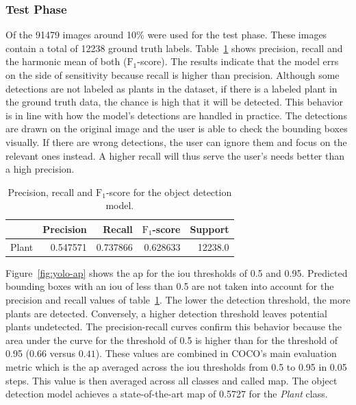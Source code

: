 \documentclass[draft,final]{vutinfth} %
\begin{document}
\subsubsection{Test Phase}
\label{sssec:yolo-test}

Of the 91479 images around 10\% were used for the test phase. These
images contain a total of 12238 ground truth
labels. Table~\ref{tab:yolo-metrics} shows precision, recall and the
harmonic mean of both ($\mathrm{F}_1$-score). The results indicate
that the model errs on the side of sensitivity because recall is
higher than precision. Although some detections are not labeled as
plants in the dataset, if there is a labeled plant in the ground truth
data, the chance is high that it will be detected. This behavior is in
line with how the model's detections are handled in practice. The
detections are drawn on the original image and the user is able to
check the bounding boxes visually. If there are wrong detections, the
user can ignore them and focus on the relevant ones instead. A higher
recall will thus serve the user's needs better than a high precision.

\begin{table}[h]
  \centering
  \begin{tabular}{lrrrr}
    \toprule
    {} &  Precision &    Recall &  $\mathrm{F}_1$-score &  Support \\
    \midrule
    Plant        &   0.547571 &  0.737866 &  0.628633 &  12238.0 \\
    \bottomrule
  \end{tabular}
  \caption{Precision, recall and $\mathrm{F}_1$-score for the object
    detection model.}
  \label{tab:yolo-metrics}
\end{table}

Figure~\ref{fig:yolo-ap} shows the \gls{ap} for the \gls{iou}
thresholds of 0.5 and 0.95. Predicted bounding boxes with an \gls{iou}
of less than 0.5 are not taken into account for the precision and
recall values of table~\ref{tab:yolo-metrics}. The lower the detection
threshold, the more plants are detected. Conversely, a higher
detection threshold leaves potential plants undetected. The
precision-recall curves confirm this behavior because the area under
the curve for the threshold of 0.5 is higher than for the threshold of
0.95 ($0.66$ versus $0.41$). These values are combined in COCO's
\cite{lin2015} main evaluation metric which is the \gls{ap} averaged
across the \gls{iou} thresholds from 0.5 to 0.95 in 0.05 steps. This
value is then averaged across all classes and called \gls{map}. The
object detection model achieves a state-of-the-art \gls{map} of 0.5727
for the \emph{Plant} class.
\end{document}
